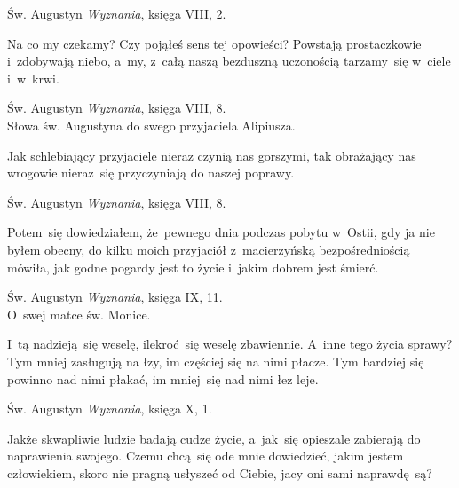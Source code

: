 \documentclass[a4paper,11pt]{article}
\newcommand{\attribA}[1]{#1}
\begin{document}
\attribA{Św. Augustyn \textit{Wyznania}, księga VIII, 2.}

\vspace{\spaceThree}



\noindent
Na co my czekamy? Czy pojąłeś sens tej opowieści? Powstają
prostaczkowie i~zdobywają niebo, a~my, z~całą naszą bezduszną
uczonością tarzamy~się w~ciele i~w~krwi.


\attribA{Św. Augustyn \textit{Wyznania}, księga VIII, 8. \\
  Słowa św. Augustyna do swego przyjaciela Alipiusza.}

\vspace{\spaceThree}



\noindent
Jak schlebiający przyjaciele nieraz czynią nas gorszymi, tak
obrażający nas wrogowie nieraz~się przyczyniają do naszej poprawy.


\attribA{Św. Augustyn \textit{Wyznania}, księga VIII, 8.}

\vspace{\spaceThree}



\noindent
Potem~się dowiedziałem, że~pewnego dnia podczas pobytu w~Ostii,
gdy ja nie byłem obecny, do kilku moich przyjaciół z~macierzyńską
bezpośredniością mówiła, jak godne pogardy jest to życie i~jakim
dobrem jest śmierć.


\attribA{Św. Augustyn \textit{Wyznania}, księga IX, 11. \\
  O~swej matce św. Monice.}

\vspace{\spaceThree}



\noindent
I~tą nadzieją~się weselę, ilekroć~się weselę zbawiennie. A~inne
tego życia sprawy? Tym mniej zasługują na łzy, im częściej się na nimi
płacze. Tym bardziej się powinno nad nimi płakać, im mniej~się nad
nimi łez leje.


\attribA{Św. Augustyn \textit{Wyznania}, księga X, 1.}

\vspace{\spaceThree}



\noindent
Jakże skwapliwie ludzie badają cudze życie, a~jak~się opieszale
zabierają do naprawienia swojego. Czemu chcą~się ode mnie dowiedzieć,
jakim jestem człowiekiem, skoro nie pragną usłyszeć od Ciebie, jacy
oni sami naprawdę~są?
\end{document}
